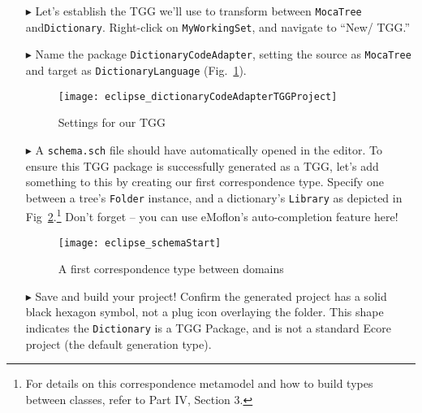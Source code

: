 \begin{enumerate}

\item[$\blacktriangleright$] Let's establish the TGG we'll use to transform between  \texttt{MocaTree} and\texttt{Dictionary}. Right-click on
\texttt{MyWorkingSet}, and navigate to ``New/ TGG.''

\item[$\blacktriangleright$] Name the package \texttt{DictionaryCodeAdapter}, setting the source as \texttt{MocaTree} and
target as \texttt{DictionaryLanguage} (Fig.~\ref{eclipse:newTGGProject}).

\begin{figure}[htbp]
\begin{center}
  \texttt{[image: eclipse\_dictionaryCodeAdapterTGGProject]}
  \caption{Settings for our TGG}
  \label{eclipse:newTGGProject}
\end{center}
\end{figure}

\item[$\blacktriangleright$] A \texttt{schema.sch} file should have automatically opened in the editor. To ensure this TGG package is successfully generated as
a TGG, let's add something to this by creating our first correspondence type. Specify one between a tree's \texttt{Folder} instance, and a dictionary's
\texttt{Library} as depicted in Fig~\ref{eclipse:firstSchema}.\footnote{For details on this correspondence metamodel and how to build types
between classes, refer to Part IV, Section 3.} Don't forget -- you can use eMoflon's auto-completion feature here!

\begin{figure}[htbp]
\begin{center}
  \texttt{[image: eclipse\_schemaStart]}
  \caption{A first correspondence type between domains}
  \label{eclipse:firstSchema}
\end{center}
\end{figure}

\item[$\blacktriangleright$] Save and build your project! Confirm the generated project has a solid black hexagon symbol, not a plug icon
overlaying the folder. This shape indicates the \texttt{Dictionary} is a TGG Package, and is not a standard Ecore project (the default generation type).

\end{enumerate}
